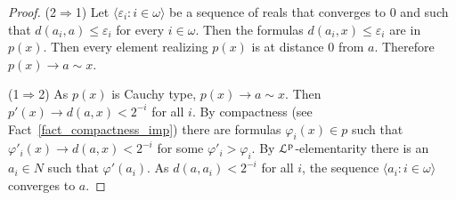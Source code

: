 \documentclass[10pt,oneside]{amsproc}
\begin{document}
{\begin{proof}

  (2$\Rightarrow$1) 
  Let $\langle \varepsilon_i: i\in\omega\rangle$ be a sequence of reals that converges to $0$ and such that $d(a_i,a)\le\varepsilon_i$ for every $i\in\omega$.
  Then the formulas $d(a_i,x)\le\varepsilon_i$ are in $p(x)$.
  Then every element realizing $p(x)$ is at distance $0$ from $a$.
  Therefore  $p(x)\rightarrow a\sim x$.

  (1$\Rightarrow$2) 
  As $p(x)$ is Cauchy type, $p(x)\rightarrow a\sim x$.
  Then $p'(x)\rightarrow d(a,x)<2^{-i}$ for all $i$.
  By compactness (see Fact~\ref{fact_compactness_imp}) there are formulas $\varphi_i(x)\in p$ such that $\varphi'_i(x)\rightarrow d(a,x)<2^{-i}$ for some $\varphi'_i>\varphi_i$.
  By ${\EuScript L}^{\rm p}$-elementarity there is an $a_i\in N$ such that $\varphi'(a_i)$.
  As $d(a,a_i)<2^{-i}$ for all $i$, the sequence $\langle a_i: i\in\omega\rangle$ converges to $a$.
\end{proof}






}
\end{document}
